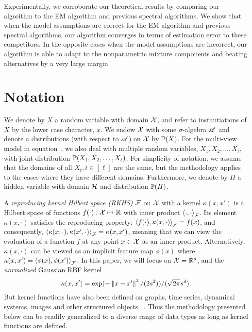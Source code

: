 \documentclass{article}
\begin{document}
Experimentally, we corroborate our theoretical results by comparing our algorithm to the EM algorithm and previous spectral algorithms. We show that when the model assumptions are correct for the EM algorithm and previous spectral algorithms, our algorithm converges in terms of estimation error to these competitors. In the opposite cases when the model assumptions are incorrect, our algorithm is able to adapt to the nonparametric mixture components and beating alternatives by a very large margin.

\vspace{-3mm}
\section{Notation}
\vspace{-2mm}

We  denote by $X$ a random variable with domain $\mathcal{X}$,
and refer to instantiations of $X$ by the lower case character, $x$.
We endow $\mathcal{X}$ with some $\sigma$-algebra $\mathscr{A}$ and denote a distributions (with respect to $\mathscr{A}$) on $\mathcal{X}$ by $\mathbb{P}(X)$. For the multi-view model in equation~, we also deal with multiple random variables, $X_1, X_2, \ldots, X_{\ell}$, with joint distribution $\mathbb{P}(X_1,X_2,\ldots,X_{\ell})$. For simplicity of notation, we assume that the domains of all $X_t, t \in [\ell]$ are the same, but the methodology applies to the cases where they have different domains. Furthermore, we denote by $H$ a hidden variable with domain $\mathcal{H}$ and distribution $\mathbb{P}(H)$.

A \emph{reproducing kernel Hilbert space (RKHS)} $\mathcal{F}$ on $\mathcal{X}$ with a kernel $\kappa(x,x')$ is a Hilbert space of
functions $f(\cdot):\mathcal{X} \mapsto \mathbb{R}$ with inner product $\left\langle \cdot,\cdot \right\rangle_{\mathcal{F}}$. Its element $\kappa(x,\cdot)$ satisfies the reproducing property:
$\left\langle f(\cdot),\kappa(x, \cdot) \right\rangle_{\mathcal{F}} = f(x)$, and consequently, $\left\langle \kappa(x,\cdot),\kappa(x', \cdot) \right\rangle_{\mathcal{F}} = \kappa(x,x')$,
meaning that we can view the evaluation of a function $f$ at any point $x\in\mathcal{X}$ as an inner product. Alternatively, $\kappa(x,\cdot)$ can  be viewed as an implicit feature map $\phi(x)$ where $\kappa(x,x')=\left\langle \phi(x),\phi(x') \right\rangle_{\mathcal{F}}$.
In this paper, we will focus on $\mathcal{X}=\mathbb{R}^d$, and the \emph{normalized} Gaussian RBF kernel
\begin{align}
\kappa(x,x') = \exp(- \left\|x-x'\right\|^2 / (2 s^2)) / (\sqrt{2\pi} s^d). \label{eq:normalizedrbf}
\end{align}
But kernel functions have also been defined on
graphs, time series, dynamical systems, images and other structured
objects \, \cite{SchTsuVer04}. Thus the methodology presented below can be readily generalized to a diverse range of data types as long as kernel functions are defined.
\end{document}
